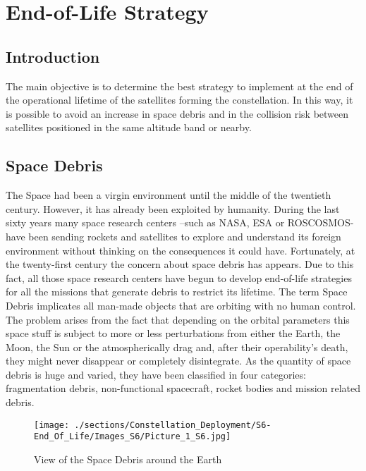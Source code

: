 \section{End-of-Life Strategy}

\subsection{Introduction}

The main objective is to determine the best strategy to implement at the end of the operational lifetime of the satellites forming the constellation. In this way, it is possible to avoid an increase in space debris and in the collision risk between satellites positioned in the same altitude band or nearby.

\subsection{Space Debris}
The Space had been a virgin environment until the middle of the twentieth century. However, it has already been exploited by humanity. During the last sixty years many space research centers –such as NASA, ESA or ROSCOSMOS- have been sending rockets and satellites to explore and understand its foreign environment without thinking on the consequences it could have. Fortunately, at the twenty-first century the concern about space debris has appears. Due to this fact, all those space research centers have begun to develop end-of-life strategies for all the missions that generate debris to restrict its lifetime. 
\newline
\newline
The term Space Debris implicates all man-made objects that are orbiting with no human control. The problem arises from the fact that depending on the orbital parameters this space stuff is subject to more or less perturbations from either the Earth, the Moon, the Sun or the atmospherically drag and, after their operability’s death, they might never disappear or completely disintegrate. As the quantity of space debris is huge and varied, they have been classified in four categories: fragmentation debris, non-functional spacecraft, rocket bodies and mission related debris. 
\newline
\newline
\begin{figure}
\centering 
\texttt{[image: ./sections/Constellation\_Deployment/S6-End\_Of\_Life/Images\_S6/Picture\_1\_S6.jpg]} 
\caption{View of the Space Debris around the Earth}
\end{figure}
